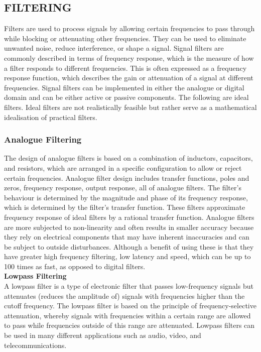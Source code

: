 \documentclass[12pt,a4paper]{article}
\begin{document}
	\subsection{FILTERING}
		\normalsize
		Filters are used to process signals by allowing certain frequencies to pass through while blocking or attenuating other frequencies. They can be used to eliminate unwanted noise, reduce
		interference, or shape a signal. Signal filters are commonly described in terms of frequency response, which is the measure of how a filter responds to different frequencies. This is often
		expressed as a frequency response function, which describes the gain or attenuation of a signal at different frequencies. Signal filters can be implemented in either the analogue or digital domain
		and can be either active or passive components.
		The following are ideal filters. Ideal filters are not realistically feasible but rather serve as a mathematical idealisation of practical filters.

		
			\subsubsection{Analogue Filtering}
				The design of analogue filters is based on a combination of inductors, capacitors, and resistors, which are arranged in a specific configuration to allow or reject certain frequencies.
				Analogue filter design includes transfer functions, poles and zeros, frequency response, output response, all of analogue filters\cite{AnalogueFilters}. The filter's behaviour is determined by the magnitude and phase of its frequency response, which is determined by the filter's transfer function. These filters
				approximate frequency response of ideal filters by a rational transfer function\cite{EE213}. Analogue filters are more subjected to non-linearity
				and often results in smaller accuracy because they rely on electrical components that may have inherent inaccuracies and can be subject to outside disturbances\cite{SignalSuppression}. Although a benefit of using these is that they have greater high frequency filtering,
				low latency and speed, which can be up to 100 times as fast, as opposed to digital filters.\\
\newpage
\vspace*{5mm}
\textbf{Lowpass Filtering}\\
				A lowpass filter is a type of electronic filter that passes low-frequency signals but attenuates (reduces the amplitude of) signals with frequencies higher than the cutoff frequency. 
				The lowpass filter is based on the principle of frequency-selective attenuation, whereby signals with frequencies within a certain range are allowed to pass while frequencies outside
				of this range are attenuated. Lowpass filters can be used in many different applications such as audio, video, and telecommunications.
					
\end{document}
